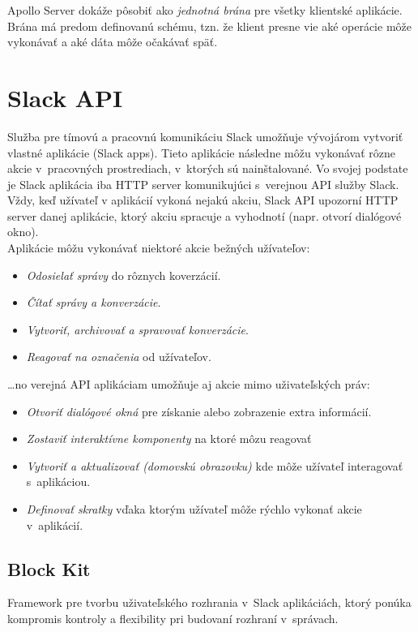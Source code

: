 \noindent Apollo Server dokáže pôsobiť ako \emph{jednotná brána} pre všetky klientské aplikácie. Brána má predom definovanú schému, tzn. že klient presne vie aké operácie môže vykonávať a aké dáta môže očakávať späť.

\section{Slack API}
\label{theory:slack_api}
Služba pre tímovú a pracovnú komunikáciu Slack umožňuje vývojárom vytvoriť vlastné aplikácie (Slack apps). Tieto aplikácie následne môžu vykonávať rôzne akcie v~pracovných prostrediach, v~ktorých sú nainštalované. Vo svojej podstate je Slack aplikácia iba HTTP server komunikujúci s~verejnou API služby Slack. Vždy, keď užívateľ v aplikácií vykoná nejakú akciu, Slack API upozorní HTTP server danej aplikácie, ktorý akciu spracuje a vyhodnotí (napr. otvorí dialógové okno). \\

\noindent Aplikácie môžu vykonávať niektoré akcie bežných užívateľov:

\begin{itemize}
	\item \emph{Odosielať správy} do rôznych koverzácií. \cite{SlackAPI}
	\item \emph{Čítať správy a konverzácie}. \cite{SlackAPI}
	\item \emph{Vytvoriť, archivovať a spravovať konverzácie}. \cite{SlackAPI}
	\item \emph{Reagovať na označenia} od užívateľov. \cite{SlackAPI}
\end{itemize}

\ldots no verejná API aplikáciam umožňuje aj akcie mimo uživateľských práv:

\begin{itemize}
	\item \emph{Otvoriť dialógové okná} pre získanie alebo zobrazenie extra informácií. \cite{SlackAPI}
	\item \emph{Zostaviť interaktívne komponenty} na ktoré môzu reagovať \cite{SlackAPI}
	\item \emph{Vytvoriť a aktualizovať  (domovskú obrazovku)} kde môže užívateľ interagovať s~aplikáciou. \cite{SlackAPI}
	\item \emph{Definovať skratky} vďaka ktorým užívateľ môže rýchlo vykonať akcie v~aplikácií. \cite{SlackAPI}
\end{itemize}

\subsection{Block Kit}
Framework pre tvorbu uživateľského rozhrania v~Slack aplikáciách, ktorý ponúka kompromis kontroly a flexibility pri budovaní rozhraní v~správach. \cite{SlackAPI}

